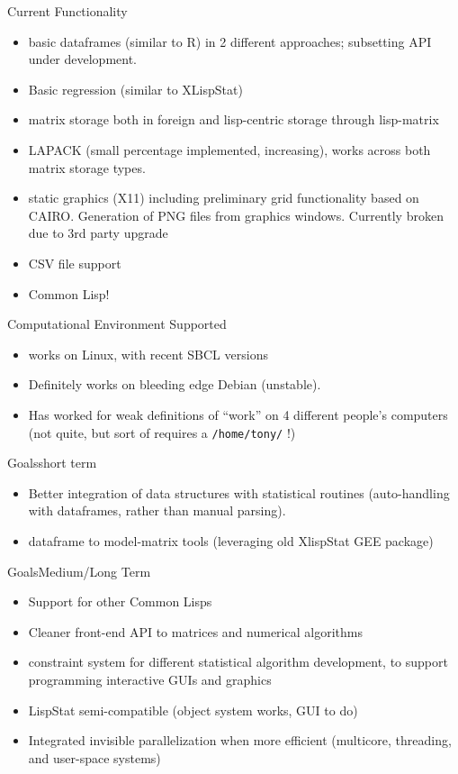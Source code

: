 \documentclass{beamer}
\begin{document}
\begin{frame}{Current Functionality}
  \begin{itemize}
  \item basic dataframes (similar to R) in 2 different approaches;
    subsetting API under development.
  \item Basic regression (similar to XLispStat)
  \item matrix storage both in foreign and lisp-centric storage
    through lisp-matrix
  \item LAPACK (small percentage implemented, increasing), works
    across both matrix storage types.
  \item static graphics (X11) including preliminary grid functionality
    based on CAIRO.  Generation of PNG files from graphics windows.
    Currently broken due to 3rd party upgrade
  \item CSV file support
  \item Common Lisp!
  \end{itemize}
\end{frame}

\begin{frame}[fragile]{Computational Environment Supported}
  \begin{itemize}
  \item works on Linux, with recent SBCL versions
  \item Definitely works on bleeding edge Debian (unstable).
  \item Has worked for weak definitions of ``work'' on 4 different
    people's computers (not quite, but sort of requires a
    \verb+/home/tony/+ !)
  \end{itemize}
\end{frame}

\begin{frame}{Goals}{short term}
  \begin{itemize}
  \item Better integration of data structures with statistical routines
    (auto-handling with dataframes, rather than manual parsing). 
  \item dataframe to model-matrix tools (leveraging old XlispStat GEE
    package)
  \end{itemize}
\end{frame}

\begin{frame}{Goals}{Medium/Long Term}
  \begin{itemize}
  \item Support for other Common Lisps
  \item Cleaner front-end API to matrices and numerical algorithms
  \item constraint system for different statistical algorithm
    development, to support programming interactive GUIs and graphics
  \item LispStat semi-compatible (object system works, GUI to do)
  \item Integrated invisible parallelization when more efficient
    (multicore, threading, and user-space systems)
  \end{itemize}
\end{frame}
\end{document}
